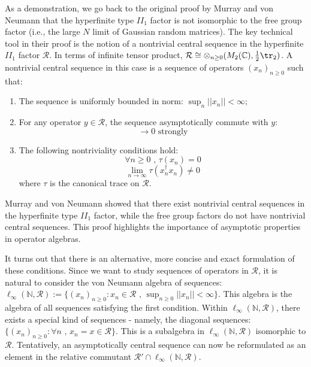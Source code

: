 \documentclass[a4paper,11pt]{article}
\theoremstyle{definition}
\numberwithin{equation}{section}
\begin{document}
As a demonstration, we go back to the original proof by Murray and von Neumann \cite{MvN}that the hyperfinite type $II_1$ factor is not isomorphic to the free group factor (i.e., the large $N$ limit of Gaussian random matrices). The key technical tool in their proof is the notion of a nontrivial central sequence in the hyperfinite $II_1$ factor $\mathcal{R}$. In terms of infinite tensor product, $\mathcal{R}\cong\otimes_{n\geq 0}(M_2(\mathbb{C}), \frac{1}{2}\tr_2)$. A nontrivial central sequence in this case is a sequence of operators $(x_n)_{n\geq 0}$ such that:
\begin{enumerate}
    \item The sequence is uniformly bounded in norm: $\sup_n||x_n|| < \infty$;
    \item For any operator $y\in \mathcal{R}$, the sequence asymptotically commute with $y$:
    \begin{equation}
        [x_n,y]\rightarrow 0\text{ strongly}
    \end{equation}
    \item The following nontriviality conditions hold:
    \begin{equation}
        \forall n\geq 0\text{ , }\tau(x_n) = 0
    \end{equation}
    \begin{equation}
        \lim_{n\rightarrow\infty}\tau(x_n^\dagger x_n) \neq 0
    \end{equation}
    where $\tau$ is the canonical trace on $\mathcal{R}$.
\end{enumerate}
Murray and von Neumann showed that there exist nontrivial central sequences in the hyperfinite type $II_1$ factor, while the free group factors do not have nontrivial central sequences. This proof highlights the importance of asymptotic properties in operator algebras. 

It turns out that there is an alternative, more concise and exact formulation of these conditions. Since we want to study sequences of operators in $\mathcal{R}$, it is natural to consider the von Neumann algebra of sequences: $\ell_\infty(\mathbb{N},\mathcal{R}) := \{(x_n)_{n\geq 0}:x_n\in\mathcal{R}\text{ , }\sup_{n\geq 0}||x_n|| < \infty\}$. This algebra is the algebra of all sequences satisfying the first condition. Within $\ell_\infty(\mathbb{N},\mathcal{R})$, there exists a special kind of sequences - namely, the diagonal sequences: $\{(x_n)_{n\geq 0}:\forall n\text{ , }x_n = x\in\mathcal{R}\}$. This is a subalgebra in $\ell_\infty(\mathbb{N}, \mathcal{R})$ isomorphic to $\mathcal{R}$. Tentatively, an asymptotically central sequence can now be reformulated as an element in the relative commutant $\mathcal{R}'\cap \ell_\infty(\mathbb{N}, \mathcal{R})$.
\end{document}
